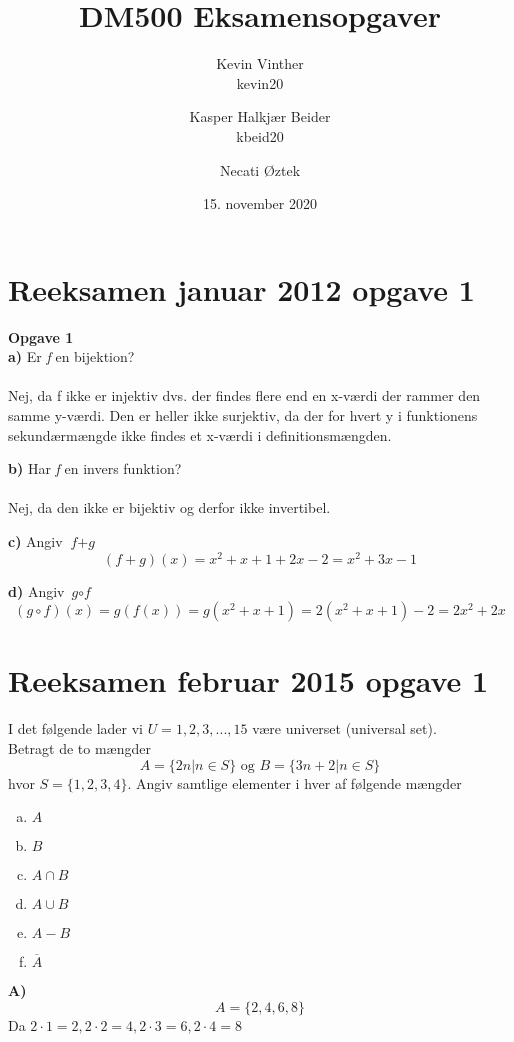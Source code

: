 \documentclass{article}
\title{DM500 Eksamensopgaver}
\author{ Kevin Vinther\\kevin20 \and Kasper Halkjær Beider\\kbeid20 \and Necati Øztek}
\date{15. november 2020}
\begin{document}
\maketitle

\newpage

\section{Reeksamen januar 2012 opgave 1}
\textbf{Opgave 1}\\

\textbf{a)} Er \textit{f} en bijektion?\\
\\Nej, da f ikke er injektiv dvs. der findes flere end en x-værdi der rammer den samme y-værdi. Den er heller ikke surjektiv, da der for hvert y i funktionens sekundærmængde ikke findes et x-værdi i definitionsmængden.

\textbf{b)} Har \textit{f} en invers funktion?\\
\\Nej, da den ikke er bijektiv og derfor ikke invertibel.

\textbf{c)} Angiv $\textit{f} + \textit{g}$
\[(f+g)(x)=x^2+x+1+2x-2=x^2+3x-1\]

\textbf{d)} Angiv $\textit{g} \circ \textit{f}$
\[(g \circ f)(x)=g(f(x))=g(x^2+x+1)=2(x^2+x+1)-2=2x^2+2x\]
\section{Reeksamen februar 2015 opgave 1}
I det følgende lader vi $U = {1, 2, 3, ...,15}$ være universet (universal set). \\
Betragt de to mængder
$$A = \{2n | n \in S\} \textrm{ og } B = \{3n+2|n\in S\}$$
hvor $S = \{1, 2, 3, 4\}$.
Angiv samtlige elementer i hver af følgende mængder
\begin{enumerate}[a)]
    \item $A$
    \item $B$
    \item $A \cap B$
    \item $A \cup B$
    \item $A - B$
    \item $\overline{A}$
\end{enumerate}

\textbf{A)}\\
$$A = \{2, 4, 6, 8\}$$
Da $2\cdot1 = 2, 2\cdot2 = 4, 2\cdot 3 = 6, 2\cdot4 = 8$\\
\end{document}
